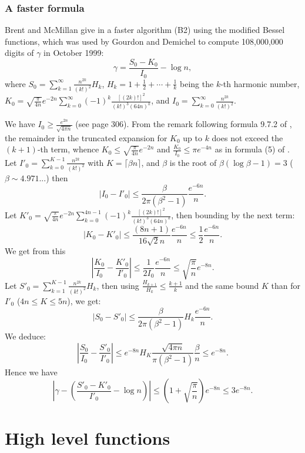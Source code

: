 \documentclass[12pt]{amsart}
\begin{document}
\subsubsection{A faster formula}

Brent and McMillan give in \cite{BrMc80} a faster algorithm (B2) using the
modified Bessel functions, which was
used by Gourdon and Demichel to compute 108,000,000 digits of $\gamma$ in
October 1999:
\[ \gamma = \frac{S_0 - K_0}{I_0} - \log n, \]
where $S_0 = \sum_{k=1}^{\infty} \frac{n^{2k}}{(k!)^2} H_k$,
$H_k = 1 + \frac{1}{2} + \cdots + \frac{1}{k}$ being the $k$-th harmonic
number,
$K_0 = \sqrt{\frac{\pi}{4n}} e^{-2n} \sum_{k=0}^{\infty}
        (-1)^k \frac{[(2k)!]^2}{(k!)^3 (64n)^k}$,
and $I_0 = \sum_{k=0}^{\infty} \frac{n^{2k}}{(k!)^2}$.

We have $I_0 \ge \frac{e^{2n}}{\sqrt{4 \pi n}}$ (see \cite{BrMc80} page 306).
From the remark following formula 9.7.2 of \cite{AbSt73},
the remainder in the truncated expansion for $K_0$ up to $k$ does not
exceed the $(k+1)$-th term, whence
$K_0 \le \sqrt{\frac{\pi}{4n}} e^{-2n}$ and
$\frac{K_0}{I_0} \le \pi e^{-4n}$ as in formula (5) of \cite{BrMc80}.
Let $I'_0 = \sum_{k=0}^{K-1} \frac{n^{2k}}{(k!)^2}$ with
$K = \lceil \beta n \rceil$, and $\beta$ is the root of
$\beta (\log \beta - 1) = 3$
($\beta \sim 4.971...$) then
\[ |I_0 - I'_0| \le \frac{\beta}{2 \pi (\beta^2-1)} \frac{e^{-6n}}{n}. \]
Let $K'_0 = \sqrt{\frac{\pi}{4n}} e^{-2n} \sum_{k=0}^{4n-1} (-1)^k
        \frac{[(2k)!]^2}{(k!)^3 (64n)^k}$, then bounding by the next term:
\[ |K_0 - K'_0| \le \frac{(8n+1)}{16 \sqrt{2} n} \frac{e^{-6n}}{n}
        \le \frac{1}{2} \frac{e^{-6n}}{n}. \]
We get from this
\[ \left| \frac{K_0}{I_0} - \frac{K'_0}{I'_0} \right| 
        \le \frac{1}{2 I_0} \frac{e^{-6n}}{n} \le \sqrt{\frac{\pi}{n}}
        e^{-8n}. \]
Let $S'_0 = \sum_{k=1}^{K-1} \frac{n^{2k}}{(k!)^2} H_k$,
then using $\frac{H_{k+1}}{H_k} \le \frac{k+1}{k}$ and the same bound $K$
than for $I'_0$ ($4n \le K \le 5n$), we get:
\[ |S_0 - S'_0| \le \frac{\beta}{2 \pi (\beta^2-1)} H_k \frac{e^{-6n}}{n}. \]
We deduce:
\[ \left| \frac{S_0}{I_0} - \frac{S'_0}{I'_0} \right|
        \le e^{-8n} H_K \frac{\sqrt{4 \pi n}}{\pi (\beta^2-1)}
        \frac{\beta}{n} \le e^{-8n}. \]
Hence we have
\[ \left| \gamma - \left( \frac{S'_0 - K'_0}{I'_0} - \log n \right) \right|
        \le (1 + \sqrt{\frac{\pi}{n}}) e^{-8n} 
        \le 3 e^{-8n}. \]

\section{High level functions}
\end{document}
